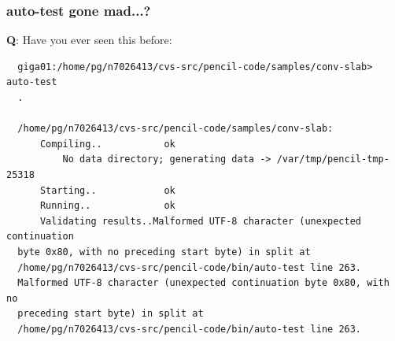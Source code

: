 \documentclass[\mydriver,12pt,twoside,notitlepage,a4paper]{article}
\begin{document}





\subsubsection{auto-test gone mad...?}

{\bf Q}: Have you ever seen this before:
\begin{Verbatim}
  giga01:/home/pg/n7026413/cvs-src/pencil-code/samples/conv-slab> auto-test
  .

  /home/pg/n7026413/cvs-src/pencil-code/samples/conv-slab:
      Compiling..           ok
          No data directory; generating data -> /var/tmp/pencil-tmp-25318
      Starting..            ok
      Running..             ok
      Validating results..Malformed UTF-8 character (unexpected continuation
  byte 0x80, with no preceding start byte) in split at
  /home/pg/n7026413/cvs-src/pencil-code/bin/auto-test line 263.
  Malformed UTF-8 character (unexpected continuation byte 0x80, with no
  preceding start byte) in split at
  /home/pg/n7026413/cvs-src/pencil-code/bin/auto-test line 263.
\end{Verbatim}
\end{document}
